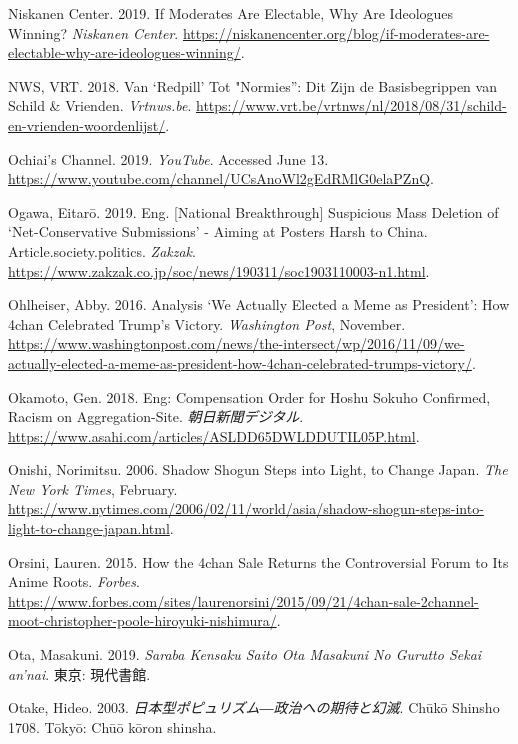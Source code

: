 \documentclass[10pt,british,A4paper,,openany]{memoir}
\begin{document}
\hypertarget{ref-niskanen_center_if_2019}{}
Niskanen Center. 2019. If Moderates Are Electable, Why Are Ideologues
Winning? \emph{Niskanen Center}.
\url{https://niskanencenter.org/blog/if-moderates-are-electable-why-are-ideologues-winning/}.

\hypertarget{ref-nws_van_2018}{}
NWS, VRT. 2018. Van `Redpill' Tot "Normies'': Dit Zijn de Basisbegrippen
van Schild \& Vrienden. \emph{Vrtnws.be}.
\url{https://www.vrt.be/vrtnws/nl/2018/08/31/schild-en-vrienden-woordenlijst/}.

\hypertarget{ref-noauthor_ochiais_nodate}{}
Ochiai's Channel. 2019. \emph{YouTube}. Accessed June 13.
\url{https://www.youtube.com/channel/UCsAnoWl2gEdRMlG0elaPZnQ}.

\hypertarget{ref-ogawa_eng._2019}{}
Ogawa, Eitarō. 2019. Eng. {[}National Breakthrough{]} Suspicious Mass
Deletion of `Net-Conservative Submissions' - Aiming at Posters Harsh to
China. Article.society.politics. \emph{Zakzak}.
\url{https://www.zakzak.co.jp/soc/news/190311/soc1903110003-n1.html}.

\hypertarget{ref-ohlheiser_analysis_2016}{}
Ohlheiser, Abby. 2016. Analysis `We Actually Elected a Meme as
President': How 4chan Celebrated Trump's Victory. \emph{Washington
Post}, November.
\url{https://www.washingtonpost.com/news/the-intersect/wp/2016/11/09/we-actually-elected-a-meme-as-president-how-4chan-celebrated-trumps-victory/}.

\hypertarget{ref-okamoto_eng:_2018}{}
Okamoto, Gen. 2018. Eng: Compensation Order for Hoshu Sokuho Confirmed,
Racism on Aggregation-Site. \emph{朝日新聞デジタル}.
\url{https://www.asahi.com/articles/ASLDD65DWLDDUTIL05P.html}.

\hypertarget{ref-onishi_shadow_2006}{}
Onishi, Norimitsu. 2006. Shadow Shogun Steps into Light, to Change
Japan. \emph{The New York Times}, February.
\url{https://www.nytimes.com/2006/02/11/world/asia/shadow-shogun-steps-into-light-to-change-japan.html}.

\hypertarget{ref-orsini_how_2015}{}
Orsini, Lauren. 2015. How the 4chan Sale Returns the Controversial Forum
to Its Anime Roots. \emph{Forbes}.
\url{https://www.forbes.com/sites/laurenorsini/2015/09/21/4chan-sale-2channel-moot-christopher-poole-hiroyuki-nishimura/}.

\hypertarget{ref-ota_saraba_2019}{}
Ota, Masakuni. 2019. \emph{Saraba Kensaku Saito Ota Masakuni No Gurutto
Sekai an'nai}. 東京: 現代書館.

\hypertarget{ref-otake__2003}{}
Otake, Hideo. 2003. \emph{日本型ポピュリズム―政治への期待と幻滅}. Chūkō
Shinsho 1708. Tōkyō: Chūō kōron shinsha.
\end{document}
